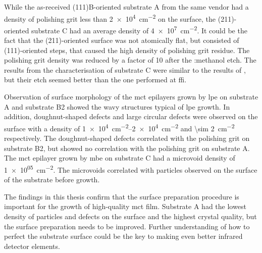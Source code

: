 While the as-received (111)B-oriented substrate A from the same vendor had a density of polishing grit less than \SI{2e4}{\centi\metre^{-2}} on the surface, the (211)-oriented substrate C had an average density of \SI{4e7}{\centi\metre^{-2}}. It could be the fact that the (211)-oriented surface was not atomically flat, but consisted of (111)-oriented steps, that caused the high density of polishing grit residue. The polishing grit density was reduced by a factor of 10 after the :methanol etch. The results from the characterisation of substrate C were similar to the results of \citeauthor{benson2016analysis}, but their etch seemed better than the one performed at \ac{ffi}.

Observation of surface morphology of the \ac{mct} epilayers grown by \ac{lpe} on substrate A and substrate B2 showed the wavy structures typical of \ac{lpe} growth. In addition, doughnut-shaped defects and large circular defects were observed on the surface with a density of \SIrange{1e4}{2e4}{\centi\metre^{-2}} and \SI{\sim 2}{\centi\metre^{-2}} respectively. The doughnut-shaped defects correlated with the polishing grit on substrate B2, but showed no correlation with the polishing grit on substrate A. The \ac{mct} epilayer grown by \ac{mbe} on substrate C had a microvoid density of \SI{1e+05}{\centi\metre^{-2}}. The microvoids correlated with particles observed on the surface of the substrate before growth.

The findings in this thesis confirm that the surface preparation procedure is important for the growth of high-quality \ac{mct} film. Substrate A had the lowest density of particles and defects on the surface and the highest crystal quality, but the surface preparation needs to be improved. Further understanding of how to perfect the substrate surface could be the key to making even better infrared detector elements.








